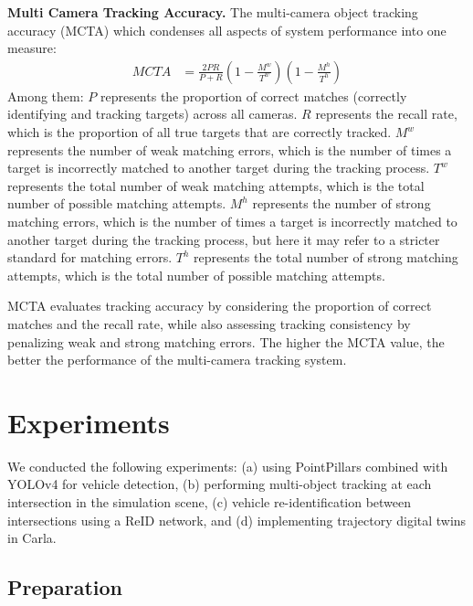\documentclass[lettersize,journal]{IEEEtran}
\begin{document}
\textbf{Multi Camera Tracking Accuracy.}
The multi-camera object tracking accuracy (MCTA) which condenses all aspects of system performance into one measure\cite{Alpher23b}:
\begin{align}
	\mathit{MCTA} & = \frac{2 P R}{P+R}\left(1-\frac{M^{w}}{T^{w}}\right)\left(1-\frac{M^{h}}{T^{h}}\right)
\end{align}
Among them:
$P$ represents the proportion of correct matches (correctly identifying and tracking targets) across all cameras.  
$R$ represents the recall rate, which is the proportion of all true targets that are correctly tracked.  
$M^{w}$ represents the number of weak matching errors, which is the number of times a target is incorrectly matched to another target during the tracking process.  
$T^{w}$ represents the total number of weak matching attempts, which is the total number of possible matching attempts.  
$M^{h}$ represents the number of strong matching errors, which is the number of times a target is incorrectly matched to another target during the tracking process, but here it may refer to a stricter standard for matching errors.  
$T^{h}$ represents the total number of strong matching attempts, which is the total number of possible matching attempts.

MCTA evaluates tracking accuracy by considering the proportion of correct matches and the recall rate, while also assessing tracking consistency by penalizing weak and strong matching errors. 
The higher the MCTA value, the better the performance of the multi-camera tracking system.


\section{Experiments}

We conducted the following experiments: 
(a) using PointPillars combined with YOLOv4 for vehicle detection, 
(b) performing multi-object tracking at each intersection in the simulation scene,
(c) vehicle re-identification between intersections using a ReID network, and 
(d) implementing trajectory digital twins in Carla.

\subsection{Preparation}
\end{document}
